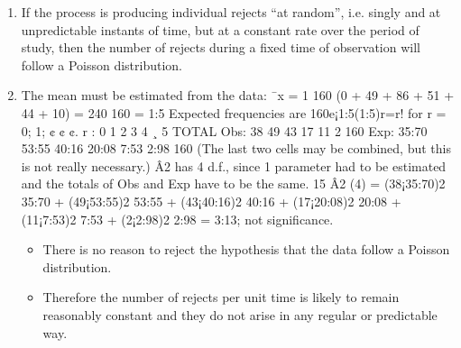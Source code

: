 \documentclass[a4paper,12pt]{article}
\begin{document}
\begin{enumerate}
\item If the process is producing individual rejects “at random”, i.e. singly and
at unpredictable instants of time, but at a constant rate over the period
of study, then the number of rejects during a fixed time of observation will
follow a Poisson distribution.
\item The mean must be estimated from the data:
¯x =
1
160
(0 + 49 + 86 + 51 + 44 + 10) =
240
160
= 1:5
Expected frequencies are 160e¡1:5(1:5)r=r! for r = 0; 1; ¢ ¢ ¢.
r : 0 1 2 3 4 ¸ 5 TOTAL
Obs: 38 49 43 17 11 2 160
Exp: 35:70 53:55 40:16 20:08 7:53 2:98 160
(The last two cells may be combined, but this is not really necessary.)
Â2 has 4 d.f., since 1 parameter had to be estimated and the totals of Obs
and Exp have to be the same.
15
Â2
(4) = (38¡35:70)2
35:70 + (49¡53:55)2
53:55 + (43¡40:16)2
40:16 + (17¡20:08)2
20:08 + (11¡7:53)2
7:53 + (2¡2:98)2
2:98
= 3:13; not significance.
\begin{itemize}
\item There is no reason to reject the hypothesis that the data follow a Poisson
distribution. 
\item Therefore the number of rejects per unit time is likely to remain
reasonably constant and they do not arise in any regular or predictable way.
\end{itemize}
\end{enumerate}
\end{document}
